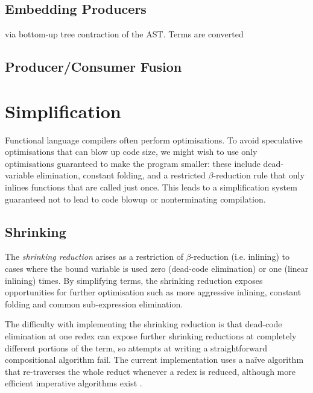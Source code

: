 \subsection{Embedding Producers}
\label{sec:embedding_producers}

via bottom-up tree contraction of the
AST. Terms are converted

\subsection{Producer/Consumer Fusion}
\label{sec:producer_consumer_fusion}

\section{Simplification}
\label{sec:simplification}

Functional language compilers often perform optimisations. To avoid speculative
optimisations that can blow up code size, we might wish to use only
optimisations guaranteed to make the program smaller: these include
dead-variable elimination, constant folding, and a restricted $\beta$-reduction
rule that only inlines functions that are called just once. This leads to a
simplification system guaranteed not to lead to code blowup or nonterminating
compilation.

\subsection{Shrinking}

The \emph{shrinking reduction} arises as a restriction of $\beta$-reduction
(i.e. inlining) to cases where the bound variable is used zero (dead-code
elimination) or one (linear inlining) times. By simplifying terms,
the shrinking reduction exposes opportunities for further optimisation such as
more aggressive inlining, constant folding and common sub-expression
elimination. %

The difficulty with implementing the shrinking reduction is that dead-code
elimination at one redex can expose further shrinking reductions at completely
different portions of the term, so attempts at writing a straightforward
compositional algorithm fail. The current implementation uses a na\"ive
algorithm that re-traverses the whole reduct whenever a redex is reduced,
although more efficient imperative algorithms exist
\cite{Appel:1997gs,Benton:2004ua,Kennedy:2007cb}.

